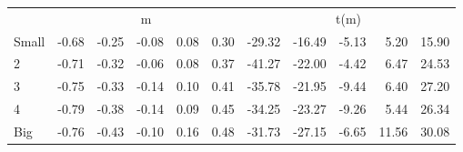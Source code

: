 \begin{table}[H]
\begin{tabular}{lrrrrrrrrrr}
  
     & \multicolumn{5}{c}{m} & \multicolumn{5}{c}{t(m)}   \\
     \cmidrule(r){2-6} \cmidrule(r){7-11} 
    Small  & -0.68  & -0.25  & -0.08  & 0.08  & 0.30  & -29.32  & -16.49  & -5.13  & 5.20  & 15.90   \\
    2  & -0.71  & -0.32  & -0.06  & 0.08  & 0.37  & -41.27  & -22.00  & -4.42  & 6.47  & 24.53   \\
    3  & -0.75  & -0.33  & -0.14  & 0.10  & 0.41  & -35.78  & -21.95  & -9.44  & 6.40  & 27.20   \\
    4  & -0.79  & -0.38  & -0.14  & 0.09  & 0.45  & -34.25  & -23.27  & -9.26  & 5.44  & 26.34   \\
    Big  & -0.76  & -0.43  & -0.10  & 0.16  & 0.48  & -31.73  & -27.15  & -6.65  & 11.56  & 30.08   \\
    
  
  \bottomrule
\end{tabular}
\label{tbl:25_Size_Prior_F17}
\end{table}